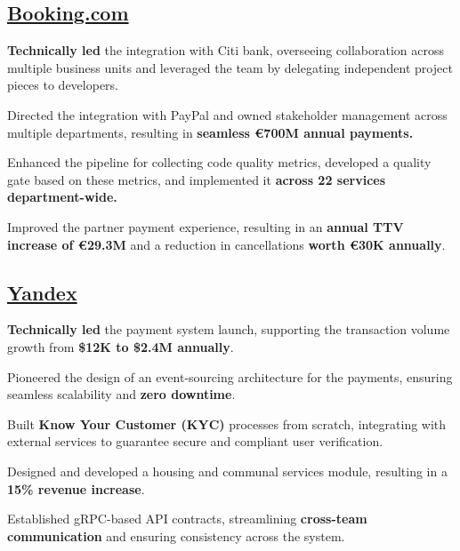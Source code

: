 \documentclass[letter,10pt]{article}
\begin{document}
\subsection{{\large\href{https://booking.com}{Booking.com}}}



\begin{zitemize}

\item \textbf{Technically led} the integration with Citi bank, overseeing collaboration across multiple business units and leveraged the team by delegating
independent project pieces to developers.

\item Directed the integration with PayPal and owned stakeholder management across multiple departments, resulting in
\textbf{seamless \euro 700M annual payments.}

\item Enhanced the pipeline for collecting code quality metrics, developed a quality gate based on these metrics, and implemented it
\textbf{across 22 services department-wide.}

\item Improved the partner payment experience, resulting in an \textbf{annual TTV increase of \euro 29.3M} and a reduction in cancellations
\textbf{worth \euro 30K annually}.

\end{zitemize}

\subsection{{\large\href{https://yandex.com/}{Yandex}}}

\begin{zitemize}
\item \textbf{Technically led} the payment system launch, supporting the transaction volume growth from \textbf{\$12K to \$2.4M annually}.

\item  Pioneered the design of an event-sourcing architecture for the payments, ensuring seamless scalability and \textbf{zero downtime}.

\item  Built \textbf{Know Your Customer (KYC)} processes from scratch, integrating with external services to guarantee secure and compliant user verification.

\item  Designed and developed a housing and communal services module, resulting in a \textbf{15\% revenue increase}.

\item  Established gRPC-based API contracts, streamlining \textbf{cross-team communication} and ensuring consistency across the system.
\end{zitemize}
\end{document}
